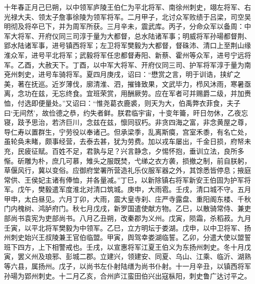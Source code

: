 \documentclass[]{article}
\begin{document}
十年春正月己巳朔，以中领军庐陵王伯仁为平北将军、南徐州刺史，翊左将军、右光禄大夫、领太子詹事徐陵为领军将军。二月甲子，北讨众军败绩于吕梁，司空吴明彻及将卒已下，并为周军所获。三月辛未，震武库。丙子，分命众军以备周：中军大将军、开府仪同三司淳于量为大都督，总水陆诸军事；明威将军孙瑒都督荆、郢水陆诸军事，进号镇西将军；左卫将军樊毅为大都督，督硃沛、清口上至荆山缘淮众军，进号平北将军；武毅将军任忠都督寿阳、新蔡、霍州等众军，进号宁远将军。乙酉，大赦天下。丁酉，以中军大将军、开府仪同三司、护军将军淳于量为南兗州刺史，进号车骑将军。夏四月庚戌，诏曰：``懋赏之言，明于训诰，挟纩之美，著在抚巡。近岁薄伐，廓清淮、泗，摧锋致果，文武毕力，栉风沐雨，寒暑亟离，念功在兹，无忘终食。宜班荣赏，用酬厥劳。应在军者可并赐爵二级，并加赉恤，付选即便量处。''又诏曰：``惟尧葛衣鹿裘，则天为大，伯禹弊衣菲食，夫子曰`无间然'，故俭德之恭，约失者鲜。朕君临宇宙，十变年籥，旰日勿休，乙夜忘寝，跂予思治，若济巨川，念兹在兹，懔同驭朽。非贪四海之富，非念黄屋之尊，导仁寿以置群生，宁劳役以奉诸己。但承梁季，乱离斯瘼，宫室禾黍，有名亡处，虽轮奂未睹，颇事经营，去泰去甚，犹为劳费。加以戎车屡出，千金日损，府帑未充，民疲征赋。百姓不足，君孰与足？兴言静念，夕惕怀抱，垂训立法，良所多惭。斫雕为朴，庶几可慕，雉头之服既焚，弋绨之衣方袭，损撤之制，前自朕躬，草偃风行，冀以变俗。应御府堂署所营造礼乐仪服军器之外，其馀悉皆停息；掖庭常供、王侯妃主诸有俸恤，并各量减。''丁巳，以新除镇右将军新安王伯固为护军将军。戊午，樊毅遣军度淮北对清口筑城。庚申，大雨雹。壬戌，清口城不守。五月甲申，太白昼见。六月丁卯，大雨，震大皇寺刹、庄严寺露盘、重阳阁东楼、千秋门内槐树、鸿胪府门。秋七月戊戌，新罗国遣使献方物。乙巳，以散骑常侍、兼吏部尚书袁宪为吏部尚书。八月乙丑朔，改秦郡为义州。戊寅，陨霜，杀稻菽。九月壬寅，以平北将军樊毅为中领军。乙巳，立方明坛于娄湖。戊申，以中卫将军、扬州刺史始兴王叔陵兼王官伯临盟。甲寅，舆驾幸娄湖临誓。乙卯，分遣大使以盟誓班下四方，上下相警戒也。壬戌，以宣惠将军江夏王伯义为东扬州刺史。冬十月戊寅，罢义州及琅邪、彭城二郡。立建兴，领建安、同夏、乌山、江乘、临沂、湖熟等六县，属扬州。戊子，以尚书左仆射陆缮为尚书仆射。十一月辛丑，以镇西将军孙瑒为郢州刺史。十二月乙亥，合州庐江蛮田伯兴出寇枞阳，刺史鲁广达讨平之。
\end{document}
